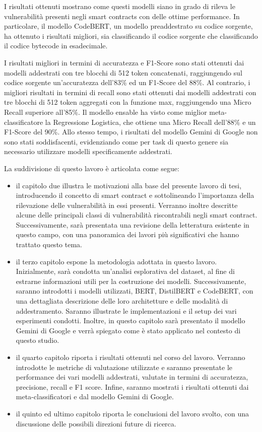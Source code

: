 \documentclass[../../Thesis.tex]{subfiles}
\begin{document}
I risultati ottenuti mostrano come questi modelli siano in grado di rileva le vulnerabilità presenti negli smart contracts con delle ottime performance. In particolare, il modello CodeBERT, un modello preaddestrato su codice sorgente, ha ottenuto i risultati migliori, sia classificando il codice sorgente che classificando il codice bytecode in esadecimale. 

I risultati migliori in termini di accuratezza e F1-Score sono stati ottenuti dai modelli addestrati con tre blocchi di 512 token concatenati, raggiungendo sul codice sorgente un'accuratezza dell'83\% ed un F1-Score del 88\%. Al contrario, i migliori risultati in termini di recall sono stati ottenuti dai modelli addestrati con tre blocchi di 512 token aggregati con la funzione max, raggiungendo una Micro Recall superiore all'85\%. Il modello ensable ha visto come miglior meta-classificatore la Regressione Logistica, che ottiene una Micro Recall dell'88\% e un F1-Score del 90\%. Allo stesso tempo, i risultati del modello Gemini di Google non sono stati soddisfacenti, evidenziando come per task di questo genere sia necessario utilizzare modelli specificamente addestrati.

La suddivisione di questo lavoro è articolata come segue:
\begin{itemize}
    \item il capitolo due illustra le motivazioni alla base del presente lavoro di tesi, introducendo il concetto di smart contract e sottolineando l'importanza della rilevazione delle vulnerabilità in essi presenti. Verranno inoltre descritte alcune delle principali classi di vulnerabilità riscontrabili negli smart contract. Successivamente, sarà presentata una revisione della letteratura esistente in questo campo, con una panoramica dei lavori più significativi che hanno trattato questo tema.
    \item il terzo capitolo espone la metodologia adottata in questo lavoro. Inizialmente, sarà condotta un'analisi esplorativa del dataset, al fine di estrarne informazioni utili per la costruzione dei modelli.  
    Successivamente, saranno introdotti i modelli utilizzati, BERT, DistilBERT e CodeBERT, con una dettagliata descrizione delle loro architetture e delle modalità di addestramento. Saranno illustrate le implementazioni e il setup dei vari esperimenti condotti. Inoltre, in questo capitolo sarà presentato il modello Gemini di Google e verrà spiegato come è stato applicato nel contesto di questo studio.
    \item il quarto capitolo riporta i risultati ottenuti nel corso del lavoro. Verranno introdotte le metriche di valutazione utilizzate e saranno presentate le performance dei vari modelli addestrati, valutate in termini di accuratezza, precisione, recall e F1 score. Infine, saranno mostrati i risultati ottenuti dai meta-classificatori e dal modello Gemini di Google.
    \item il quinto ed ultimo capitolo riporta le conclusioni del lavoro svolto, con una discussione  delle possibili direzioni future di ricerca.     
\end{itemize}
\end{document}
